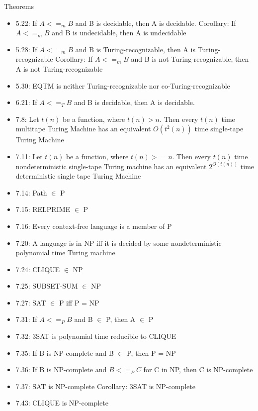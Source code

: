 \documentclass[2pt,legalpaper]{scrartcl}
\makeatletter
\renewcommand{\section}{\@startsection{section}{1}{0mm}
  {-1ex plus -.5ex minus -.2ex}
  {0.5ex plus .2ex}
{\normalfont\large\bfseries}}
\makeatother
\begin{document}
\begin{multicols}{6}
  \section{Theorems}

  \begin{itemize}
      \item 5.22: If $A <=_m B$ and B is decidable, then A is decidable. Corollary: If $A <=_m B$ and B is undecidable, then A is undecidable
        \item 5.28: If $A <=_m B$ and B is Turing-recognizable, then A is Turing-recognizable
Corollary: If $A <=_m B$ and B is not Turing-recognizable, then A is not Turing-recognizable
        \item 5.30: EQTM is neither Turing-recognizable nor co-Turing-recognizable
        \item 6.21: If $A <=_T B$ and B is decidable, then A is decidable.
        \item 7.8: Let $t(n)$ be a function, where $t(n) > n$. Then every $t(n)$ time multitape Turing Machine has an equivalent $O(t^2(n))$ time single-tape Turing Machine
        \item 7.11: Let $t(n)$ be a function, where $t(n) >= n$. Then every $t(n)$ time nondeterministic single-tape Turing machine has an equivalent $2^{O(t(n))}$ time deterministic single tape Turing Machine
        \item 7.14: Path $\in$ P
        \item 7.15: RELPRIME $\in$ P
        \item 7.16: Every context-free language is a member of P
        \item 7.20: A language is in NP iff it is decided by some nondeterministic polynomial time Turing machine
        \item 7.24: CLIQUE $\in$ NP 
        \item 7.25: SUBSET-SUM $\in$ NP
        \item 7.27: SAT $\in$ P iff P = NP
        \item 7.31: If $A <=_P B$ and B $\in$ P, then A $\in$ P
        \item 7.32: 3SAT is polynomial time reducible to CLIQUE
        \item 7.35: If B is NP-complete and B $\in$ P, then P = NP
        \item 7.36: If B is NP-complete and $B <=_P C$ for C in NP, then C is NP-complete
        \item 7.37: SAT is NP-complete
Corollary: 3SAT is NP-complete
        \item 7.43: CLIQUE is NP-complete

\end{itemize}
\end{multicols}
\end{document}
